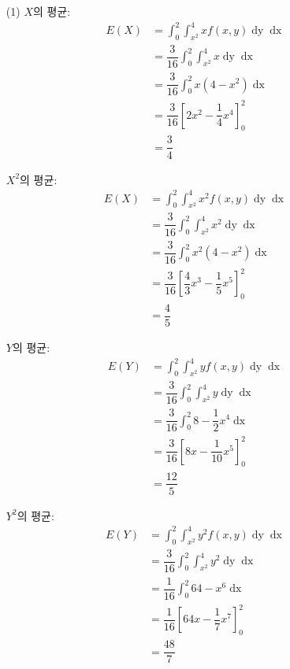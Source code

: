 \begin{itemize}
  \item [(1)] $X$의 평균:
\begin{align*}
	E\left(X\right) &= \int_0^2 \int_{x^2}^4 x f\left(x, y\right) \mathop{dy} \mathop{dx} \\
	&= \dfrac{3}{16} \int_0^2 \int_{x^2}^4 x \mathop{dy} \mathop{dx} \\
	&= \dfrac{3}{16} \int_0^2 x\left(4 - x^2\right) \mathop{dx} \\
	&= \dfrac{3}{16} \left[2x^2 - \dfrac{1}{4}x^4\right]_0^2 \\
	&= \dfrac{3}{4}
\end{align*}

$X^2$의 평균:
\begin{align*}
	E\left(X\right) &= \int_0^2 \int_{x^2}^4 x^2 f\left(x, y\right) \mathop{dy} \mathop{dx} \\
	&= \dfrac{3}{16} \int_0^2 \int_{x^2}^4 x^2 \mathop{dy} \mathop{dx} \\
	&= \dfrac{3}{16} \int_0^2 x^2\left(4 - x^2\right) \mathop{dx} \\
	&= \dfrac{3}{16} \left[\dfrac{4}{3}x^3 - \dfrac{1}{5}x^5\right]_0^2 \\
	&= \dfrac{4}{5}
\end{align*}

$Y$의 평균:
\begin{align*}
	E\left(Y\right) &= \int_0^2 \int_{x^2}^4 y f\left(x, y\right) \mathop{dy} \mathop{dx} \\
	&= \dfrac{3}{16} \int_0^2 \int_{x^2}^4 y \mathop{dy} \mathop{dx} \\
	&= \dfrac{3}{16} \int_0^2 8 - \dfrac{1}{2}x^4 \mathop{dx} \\
	&= \dfrac{3}{16} \left[8x - \dfrac{1}{10}x^5\right]_0^2 \\
	&= \dfrac{12}{5}
\end{align*}

$Y^2$의 평균:
\begin{align*}
	E\left(Y\right) &= \int_0^2 \int_{x^2}^4 y^2 f\left(x, y\right) \mathop{dy} \mathop{dx} \\
	&= \dfrac{3}{16} \int_0^2 \int_{x^2}^4 y^2 \mathop{dy} \mathop{dx} \\
	&= \dfrac{1}{16} \int_0^2 64 - x^6 \mathop{dx} \\
	&= \dfrac{1}{16} \left[64x - \dfrac{1}{7}x^7\right]_0^2 \\
	&= \dfrac{48}{7}
\end{align*}


\end{itemize}
